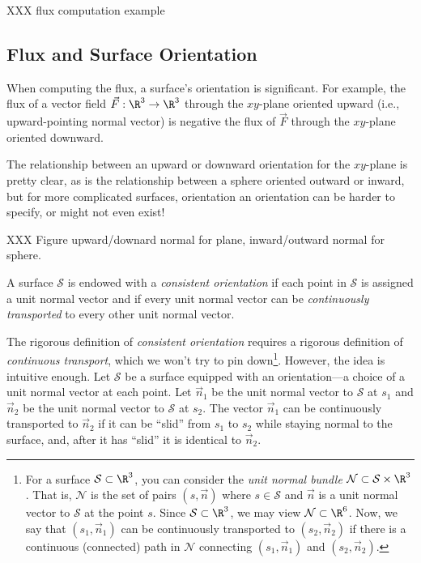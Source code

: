 \begin{example}
	XXX flux computation example
\end{example}

\subsection{Flux and Surface Orientation}

When computing the flux, a surface's orientation is significant.
For example, the flux of a vector field $\vec F:\R^3\to\R^3$ through
the $xy$-plane oriented upward (i.e., upward-pointing normal vector)
is negative the flux of $\vec F$
through the $xy$-plane oriented downward.

The relationship between an upward or downward orientation for
the $xy$-plane is pretty clear, as is the relationship between a sphere
oriented outward or inward, but for more complicated surfaces, orientation
an orientation can be harder to specify, or might not even exist!

XXX Figure upward/downard normal for plane, inward/outward normal for sphere.

\begin{definition}
	A surface $\mathcal S$ is endowed with a \emph{consistent orientation}
	if each point in $\mathcal S$ is assigned a unit normal vector and
	if every unit normal vector can be \emph{continuously transported} to every
	other unit normal vector.
\end{definition}

The rigorous definition of \emph{consistent orientation} requires a rigorous
definition of \emph{continuous transport}, which we won't try to pin down\footnote{
	For a surface $\mathcal S\subset \R^3$, you can consider the
	\emph{unit normal bundle} $\mathcal N\subset \mathcal S\times \R^3$.  That is,
	$\mathcal N$ is the set of pairs $(s,\vec n)$ where $s\in\mathcal S$ and
	$\vec n$ is a unit normal vector to $\mathcal S$ at the point $s$.  Since
	$\mathcal S\subset \R^3$, we may view $\mathcal N\subset \R^6$.  Now, we say
	that $(s_1,\vec n_1)$ can be continuously transported to $(s_2,\vec n_2)$ if
	there is a continuous (connected) path in $\mathcal N$ connecting $(s_1,\vec n_1)$ and 
	$(s_2,\vec n_2)$.
}.  However,
the idea is intuitive enough.  Let $\mathcal S$
be a surface equipped with an orientation---a choice of a unit normal vector
at each point.  Let $\vec n_1$ be the unit normal vector to $\mathcal S$ at $s_1$
and $\vec n_2$ be the unit normal vector to $\mathcal S$ at $s_2$.  The vector $\vec n_1$
can be continuously transported to $\vec n_2$ if it can be ``slid'' from $s_1$ to $s_2$ while
staying normal to the surface, and, after it has ``slid'' it is identical to $\vec n_2$.

